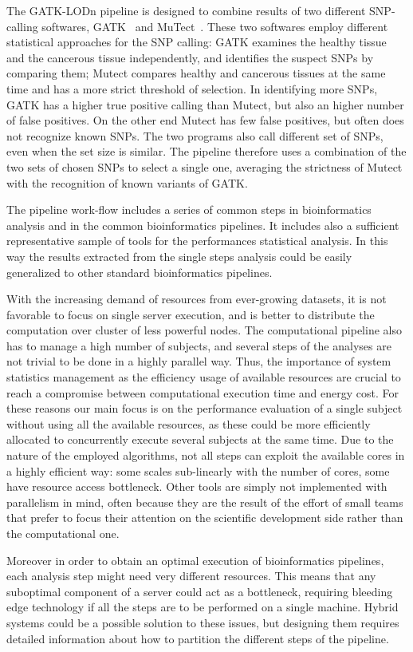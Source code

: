 \documentclass{standalone}
\begin{document}
The GATK-LODn pipeline is designed to combine results of two different SNP-calling softwares, GATK~\cite{McKenna2010} and MuTect~\cite{Cibulskis2013}.
These two softwares employ different statistical approaches for the SNP calling: GATK examines the healthy tissue and the cancerous tissue independently, and identifies the suspect SNPs by comparing them; Mutect compares healthy and cancerous tissues at the same time and has a more strict threshold of selection.
In identifying more SNPs, GATK has a higher true positive calling than Mutect, but also an higher number of false positives.
On the other end Mutect has few false positives, but often does not recognize known SNPs.
The two programs also call different set of SNPs, even when the set size is similar.
The pipeline therefore uses a combination of the two sets of chosen SNPs to select a single one, averaging the strictness of Mutect with the recognition of known variants of GATK.

The pipeline work-flow includes a series of common steps in bioinformatics analysis and in the common bioinformatics pipelines.
It includes also a sufficient representative sample of tools for the performances statistical analysis.
In this way the results extracted from the single steps analysis could be easily generalized to other standard bioinformatics pipelines.

With the increasing demand of resources from ever-growing datasets, it is not favorable to focus on single server execution, and is better to distribute the computation over cluster of less powerful nodes.
The computational pipeline also has to manage a high number of subjects, and several steps of the analyses are not trivial to be done in a highly parallel way.
Thus, the importance of system statistics management as the efficiency usage of available resources are crucial to reach a compromise between computational execution time and energy cost.
For these reasons our main focus is on the performance evaluation of a single subject without using all the available resources, as these could be more efficiently allocated to concurrently execute several subjects at the same time.
Due to the nature of the employed algorithms, not all steps can exploit the available cores in a highly efficient way: some scales sub-linearly with the number of cores, some have resource access bottleneck.
Other tools are simply not implemented with parallelism in mind, often because they are the result of the effort of small teams that prefer to focus their attention on the scientific development side rather than the computational one.

Moreover in order to obtain an optimal execution of bioinformatics pipelines, each analysis step might need very different resources.
This means that any suboptimal component of a server could act as a bottleneck, requiring bleeding edge technology if all the steps are to be performed on a single machine.
Hybrid systems could be a possible solution to these issues, but designing them requires detailed information about how to partition the different steps of the pipeline.
\end{document}
